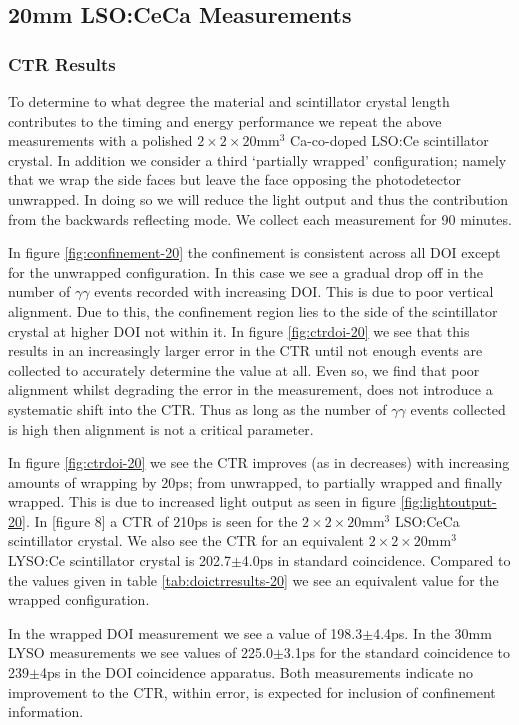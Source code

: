 \subsection{20mm LSO:CeCa Measurements}
\subsubsection{CTR Results}
To determine to what degree the material and scintillator crystal length contributes to the timing and energy performance we repeat the above measurements with a polished $2\times2\times20$mm$^3$ Ca-co-doped LSO:Ce scintillator crystal. In addition we consider a third `partially wrapped' configuration; namely that we wrap the side faces but leave the face opposing the photodetector unwrapped. In doing so we will reduce the light output and thus the contribution from the backwards reflecting mode. We collect each measurement for 90 minutes.

In figure \ref{fig:confinement-20} the confinement is consistent across all DOI except for the unwrapped configuration. In this case we see a gradual drop off in the number of $\gamma\gamma$ events recorded with increasing DOI. This is due to poor vertical alignment. Due to this, the confinement region lies to the side of the scintillator crystal at higher DOI not within it. In figure \ref{fig:ctrdoi-20} we see that this results in an increasingly larger error in the CTR until not enough events are collected to accurately determine the value at all. Even so, we find that poor alignment whilst degrading the error in the measurement, does not introduce a systematic shift into the CTR. Thus as long as the number of $\gamma\gamma$ events collected is high then alignment is not a critical parameter. 

In figure \ref{fig:ctrdoi-20} we see the CTR improves (as in decreases) with increasing amounts of wrapping by 20ps; from unwrapped, to partially wrapped and finally wrapped. This is due to increased light output as seen in figure \ref{fig:lightoutput-20}. In [figure 8] \cite{r_Paganoni_Pauwels_et_al__2011} a CTR of 210ps is seen for the $2\times2\times20$mm$^3$ LSO:CeCa scintillator crystal. We also see the CTR for an equivalent $2\times2\times20$mm$^3$ LYSO:Ce scintillator crystal is 202.7$\pm$4.0ps in standard coincidence. Compared to the values given in table \ref{tab:doictrresults-20} we see an equivalent value for the wrapped configuration.

In the wrapped DOI measurement we see a value of 198.3$\pm$4.4ps. In the 30mm LYSO measurements we see values of 225.0$\pm$3.1ps for the standard coincidence to 239$\pm$4ps in the DOI coincidence apparatus. Both measurements indicate no improvement to the CTR, within error, is expected for inclusion of confinement information.

